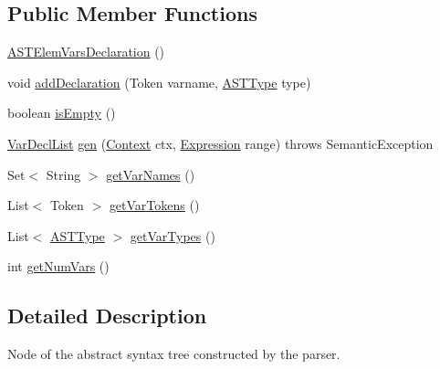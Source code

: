 \subsection*{Public Member Functions}
\begin{DoxyCompactItemize}
\item 
\hyperlink{classorg_1_1tzi_1_1use_1_1parser_1_1ocl_1_1_a_s_t_elem_vars_declaration_abd83081c685a08d3e6c80d95f654e331}{A\-S\-T\-Elem\-Vars\-Declaration} ()
\item 
void \hyperlink{classorg_1_1tzi_1_1use_1_1parser_1_1ocl_1_1_a_s_t_elem_vars_declaration_a523d272e193be8b08fb235ccdf1712ca}{add\-Declaration} (Token varname, \hyperlink{classorg_1_1tzi_1_1use_1_1parser_1_1ocl_1_1_a_s_t_type}{A\-S\-T\-Type} type)
\item 
boolean \hyperlink{classorg_1_1tzi_1_1use_1_1parser_1_1ocl_1_1_a_s_t_elem_vars_declaration_ae14744586986ddb7a47ce9a72a9b203f}{is\-Empty} ()
\item 
\hyperlink{classorg_1_1tzi_1_1use_1_1uml_1_1ocl_1_1expr_1_1_var_decl_list}{Var\-Decl\-List} \hyperlink{classorg_1_1tzi_1_1use_1_1parser_1_1ocl_1_1_a_s_t_elem_vars_declaration_a6442e571c200336286d92ca50aa33167}{gen} (\hyperlink{classorg_1_1tzi_1_1use_1_1parser_1_1_context}{Context} ctx, \hyperlink{classorg_1_1tzi_1_1use_1_1uml_1_1ocl_1_1expr_1_1_expression}{Expression} range)  throws Semantic\-Exception      
\item 
Set$<$ String $>$ \hyperlink{classorg_1_1tzi_1_1use_1_1parser_1_1ocl_1_1_a_s_t_elem_vars_declaration_ae6ef311a80b3b61a0843f60428699535}{get\-Var\-Names} ()
\item 
List$<$ Token $>$ \hyperlink{classorg_1_1tzi_1_1use_1_1parser_1_1ocl_1_1_a_s_t_elem_vars_declaration_aa00ca4bb07308e31d19ada90a258409f}{get\-Var\-Tokens} ()
\item 
List$<$ \hyperlink{classorg_1_1tzi_1_1use_1_1parser_1_1ocl_1_1_a_s_t_type}{A\-S\-T\-Type} $>$ \hyperlink{classorg_1_1tzi_1_1use_1_1parser_1_1ocl_1_1_a_s_t_elem_vars_declaration_a957f32e7f5b9255bf266562bb559eefd}{get\-Var\-Types} ()
\item 
int \hyperlink{classorg_1_1tzi_1_1use_1_1parser_1_1ocl_1_1_a_s_t_elem_vars_declaration_a7dd940d9cac09853d5265fe15d16cc1f}{get\-Num\-Vars} ()
\end{DoxyCompactItemize}


\subsection{Detailed Description}
Node of the abstract syntax tree constructed by the parser.

